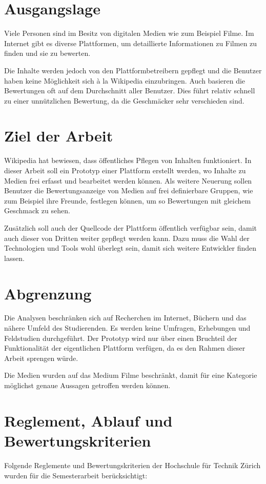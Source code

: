 \section{Ausgangslage}
Viele Personen sind im Besitz von digitalen Medien wie zum Beispiel Filme.
Im Internet gibt es diverse Plattformen, um detaillierte Informationen zu 
Filmen zu finden und sie zu bewerten. 

Die Inhalte werden jedoch von den Plattformbetreibern gepflegt und die 
Benutzer haben keine Möglichkeit sich à la Wikipedia einzubringen. Auch 
basieren die Bewertungen oft auf dem Durchschnitt aller Benutzer. Dies
führt relativ schnell zu einer unnützlichen Bewertung, da die Geschmäcker
sehr verschieden sind.

\section{Ziel der Arbeit}
Wikipedia hat bewiesen, dass öffentliches Pflegen von Inhalten 
funktioniert. In dieser Arbeit soll ein Prototyp einer Plattform erstellt
werden, wo Inhalte zu Medien frei erfasst und bearbeitet werden können.
Als weitere Neuerung sollen Benutzer die Bewertungsanzeige von Medien auf
frei definierbare Gruppen, wie zum Beispiel ihre Freunde, festlegen 
können, um so Bewertungen mit gleichem Geschmack zu sehen.

Zusätzlich soll auch der Quellcode der Plattform öffentlich verfügbar sein, 
damit auch dieser von Dritten weiter gepflegt werden kann. Dazu muss die 
Wahl der Technologien und Tools wohl überlegt sein, damit sich weitere 
Entwickler finden lassen.

\section{Abgrenzung}
Die Analysen beschränken sich auf Recherchen im Internet, Büchern und das 
nähere Umfeld des Studierenden. Es werden keine Umfragen, Erhebungen und 
Feldstudien durchgeführt. Der Prototyp wird nur über einen Bruchteil der 
Funktionalität der eigentlichen Plattform verfügen, da es den Rahmen
dieser Arbeit sprengen würde.

Die Medien wurden auf das Medium Filme beschränkt, damit für eine 
Kategorie möglichst genaue Aussagen getroffen werden können.

\section{Reglement, Ablauf und Bewertungskriterien}
Folgende Reglemente und Bewertungskriterien der Hochschule für Technik Zürich 
wurden für die Semesterarbeit berücksichtigt:


